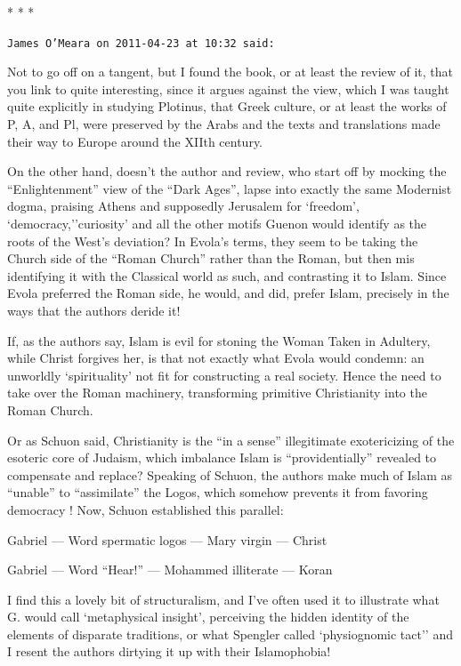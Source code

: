 \begin{center}* * *\end{center}

\begin{footnotesize}
\begin{sffamily}
\texttt{James O'Meara on 2011-04-23 at 10:32 said:}

Not to go off on a tangent, but I found the book, or at least the review of it, that you link to quite interesting, since it argues against the view, which I was taught quite explicitly in studying Plotinus, that Greek culture, or at least the works of P, A, and Pl, were preserved by the Arabs and the texts and translations made their way to Europe around the XIIth century.

On the other hand, doesn't the author and review, who start off by mocking the ``Enlightenment'' view of the ``Dark Ages'', lapse into exactly the same Modernist dogma, praising Athens and supposedly Jerusalem for `freedom', `democracy,''curiosity' and all the other motifs Guenon would identify as the roots of the West's deviation? In Evola's terms, they seem to be taking the Church side of the ``Roman Church'' rather than the Roman, but then mis identifying it with the Classical world as such, and contrasting it to Islam. Since Evola preferred the Roman side, he would, and did, prefer Islam, precisely in the ways that the authors deride it!

If, as the authors say, Islam is evil for stoning the Woman Taken in Adultery, while Christ forgives her, is that not exactly what Evola would condemn: an unworldly `spirituality' not fit for constructing a real society. Hence the need to take over the Roman machinery, transforming primitive Christianity into the Roman Church.

Or as Schuon said, Christianity is the ``in a sense'' illegitimate exotericizing of the esoteric core of Judaism, which imbalance Islam is ``providentially'' revealed to compensate and replace? Speaking of Schuon, the authors make much of Islam as ``unable'' to ``assimilate'' the Logos, which somehow prevents it from favoring democracy ! Now, Schuon established this parallel:

Gabriel --- Word spermatic logos --- Mary virgin --- Christ

Gabriel --- Word ``Hear!'' --- Mohammed illiterate --- Koran

I find this a lovely bit of structuralism, and I've often used it to illustrate what G. would call `metaphysical insight', perceiving the hidden identity of the elements of disparate traditions, or what Spengler called `physiognomic tact'' and I resent the authors dirtying it up with their Islamophobia!


\end{sffamily}
\end{footnotesize}
